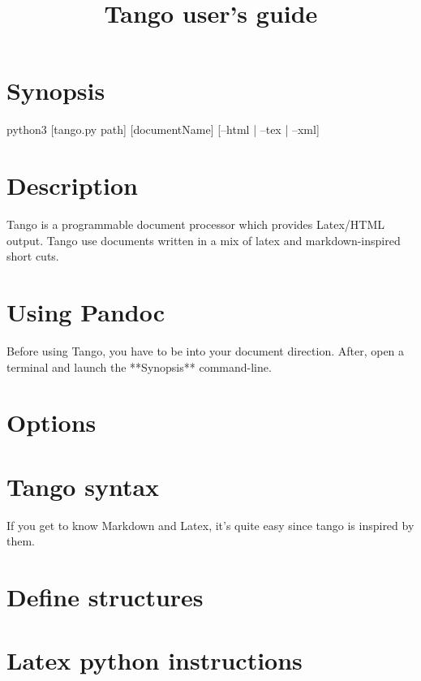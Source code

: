 \title{Tango user's guide}

\part{Synopsis}

python3 [tango.py path] [documentName] [--html | --tex | --xml]

\part{Description}

Tango is a programmable document processor which provides Latex/HTML output.
Tango use documents written in a mix of latex and markdown-inspired short cuts.

\part{Using Pandoc}

Before using Tango, you have to be into your document direction.
After, open a terminal and launch the **Synopsis** command-line.

\part{Options}



\part{Tango syntax}

If you get to know Markdown and Latex, it's quite easy since tango is inspired by them.



\part{Define structures}

%

\part{Latex python instructions}

%
